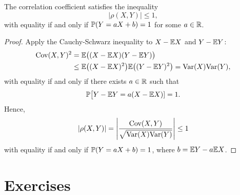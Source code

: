 \begin{corollary}
The correlation coefficient satisfies the inequality 
\[
|\rho(X,Y)|\leq 1,
\]
with equality if and only if $\mathbb{P}(Y=aX+b)=1$ for some $a\in\mathbb{R}$.
\end{corollary}

\begin{proof}
Apply the Cauchy-Schwarz inequality to $X-\mathbb{E} X$ and $Y-\mathbb{E} Y$:
\begin{align*}
\text{Cov}(X,Y)^2 
	& =		\mathbb{E}\big((X-\mathbb{E} X)(Y-\mathbb{E} Y)\big) \\
	&\leq 	\mathbb{E}\big((X-\mathbb{E} X)^2\big)\mathbb{E}\big((Y-\mathbb{E} Y)^2\big) 
	= 	\text{Var}(X)\text{Var}(Y),
\end{align*}
with equality if and only if there exists $a\in\mathbb{R}$ such that
\[
\mathbb{P}\big[Y-\mathbb{E} Y = a(X-\mathbb{E} X)] = 1.
\]
Hence,
\[	
|\rho(X,Y)| = \left|\frac{\text{Cov}(X,Y)}{\sqrt{\text{Var}(X)\text{Var}(Y)}}\right| \leq 1
\]
with equality if and only if $\mathbb{P}(Y = aX + b) = 1$,  where $b = \mathbb{E} Y - a\mathbb{E} X$.
\end{proof}


\section{Exercises}


\endinput

